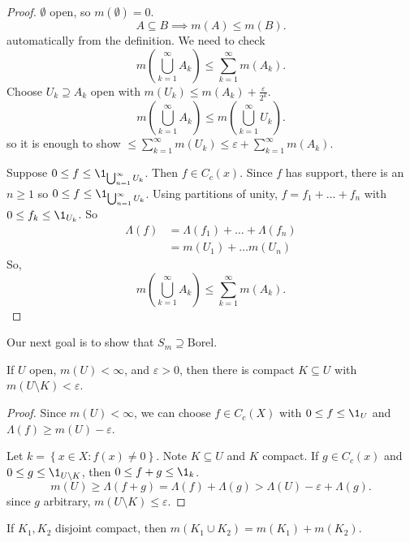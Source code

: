 \begin{proof}
	$\emptyset$ open, so $m(\emptyset) = 0$.
	\[
		A \subseteq B \implies m(A) \leq m(B).
	\]
	automatically from the definition.
	We need to check
	\[
		m \left(\bigcup_{k = 1}^{\infty} A_k \right) \leq \sum_{k = 1}^{\infty} m(A_k).
	\]
	Choose $U_k \supseteq A_k$ open with $m(U_k) \leq m(A_k) + \frac{\varepsilon}{2^k}$.
	\[
		m \left(\bigcup_{k = 1}^{\infty} A_k \right) \leq m \left( \bigcup_{k = 1}^{\infty} U_k \right).
	\]
	so it is enough to show $\leq \sum_{k = 1}^{\infty} m(U_k) \leq \varepsilon + \sum_{k = 1}^{\infty} m(A_k)$.

	Suppose $0 \leq f \leq \1_{\bigcup_{n = 1}^{\infty} U_k}$. Then $f \in C_{c}(x)$.
	Since $f$ has support, there is an $n \geq 1$ so $0 \leq f \leq \1_{\bigcup_{n = 1}^{\infty} U_k}$.
	Using partitions of unity, $f = f_1 + \ldots + f_n$ with $0 \leq f_k \leq \1_{U_k}$. So
	\begin{align*}
		\Lambda(f) & = \Lambda(f_1) + \ldots + \Lambda(f_n) \\
							 & = m(U_1) + \ldots m(U_n)
	\end{align*}
	So,
	\[
		m \left(\bigcup_{k = 1}^{\infty} A_k \right) \leq \sum_{k = 1}^{\infty} m(A_k).
	\]
\end{proof}

Our next goal is to show that $S_m \supseteq \textrm{Borel}$.

\begin{lemma}
  If $U$ open, $m(U) < \infty$, and $\varepsilon > 0$, then there is compact $K \subseteq U$ with $m(U \setminus K) < \varepsilon$.
\end{lemma}

\begin{proof}
	Since $m(U) < \infty$, we can choose $f \in C_c(X)$ with $0 \leq f \leq \1_U$ 
	and $\Lambda(f) \geq m(U) - \varepsilon$.

	Let $k = \left\{x \in X : f(x) \neq 0 \right\}$. Note $K \subseteq U$ and $K$ compact. 
	If $g \in C_c(x)$ and $0 \leq g \leq \1_{U \setminus K}$, then $0 \leq f + g \leq \1_k$. 
	\[
		m(U) \geq \Lambda(f + g) = \Lambda (f) + \Lambda (g) > \Lambda(U) - \varepsilon + \Lambda(g).
	\]
	since $g$ arbitrary, $m(U \setminus K) \leq \varepsilon$.
\end{proof}

\begin{lemma}
  If $K_1, K_2$ disjoint compact, then $m(K_1 \cup K_2) = m(K_1) + m(K_2)$.
\end{lemma}

